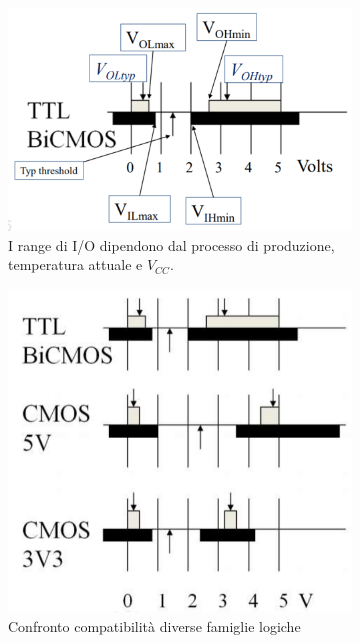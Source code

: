 \documentclass[
]{book}
\begin{document}
\begin{figure}[H]
\centering
\begin{subfigure}{0.3\textwidth}
\includegraphics[width=\textwidth]{immagini/35.png}
\caption{I range di I/O dipendono dal processo di produzione, temperatura attuale e $V_{CC}$.}
\end{subfigure}
\hfill
\begin{subfigure}{0.3\textwidth}
\includegraphics[width=\textwidth]{assets/imgs/confronto_famiglie.png}
\caption{Confronto compatibilità diverse famiglie logiche}
\end{subfigure}
\hfill
\begin{subfigure}{0.3\textwidth}

\end{subfigure}
\end{figure}
\end{document}
